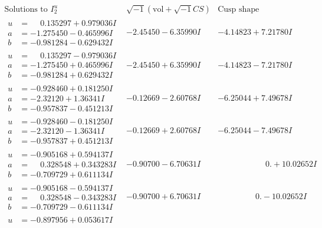 \documentclass[1p]{elsarticle_modified}
\theoremstyle{definition}
\newcommand{\I}{\sqrt{-1}}
\begin{document}
$$\begin{array}{c|c|c}  
\text{Solutions to }I^u_{2}& \I (\text{vol} + \sqrt{-1}CS) & \text{Cusp shape}\\
 \hline 
\begin{aligned}
u &= \phantom{-}0.135297 + 0.979036 I \\
a &= -1.275450 - 0.465996 I \\
b &= -0.981284 - 0.629432 I\end{aligned}
 & -2.45450 - 6.35990 I & -4.14823 + 7.21780 I \\ \hline\begin{aligned}
u &= \phantom{-}0.135297 - 0.979036 I \\
a &= -1.275450 + 0.465996 I \\
b &= -0.981284 + 0.629432 I\end{aligned}
 & -2.45450 + 6.35990 I & -4.14823 - 7.21780 I \\ \hline\begin{aligned}
u &= -0.928460 + 0.181250 I \\
a &= -2.32120 + 1.36341 I \\
b &= -0.957837 - 0.451213 I\end{aligned}
 & -0.12669 - 2.60768 I & -6.25044 + 7.49678 I \\ \hline\begin{aligned}
u &= -0.928460 - 0.181250 I \\
a &= -2.32120 - 1.36341 I \\
b &= -0.957837 + 0.451213 I\end{aligned}
 & -0.12669 + 2.60768 I & -6.25044 - 7.49678 I \\ \hline\begin{aligned}
u &= -0.905168 + 0.594137 I \\
a &= \phantom{-}0.328548 + 0.343283 I \\
b &= -0.709729 + 0.611134 I\end{aligned}
 & -0.90700 - 6.70631 I & \phantom{-0.000000 -}0. + 10.02652 I \\ \hline\begin{aligned}
u &= -0.905168 - 0.594137 I \\
a &= \phantom{-}0.328548 - 0.343283 I \\
b &= -0.709729 - 0.611134 I\end{aligned}
 & -0.90700 + 6.70631 I & \phantom{-0.000000 } 0. - 10.02652 I \\ \hline\begin{aligned}
u &= -0.897956 + 0.053617 I \\

\end{aligned}
\end{array}$$
\end{document}
